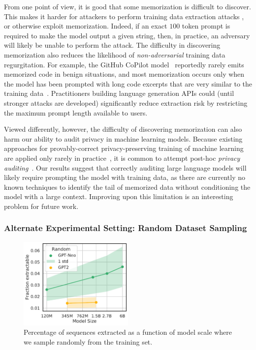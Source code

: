 From one point of view, it is good that some memorization is difficult to discover.
This makes it harder for attackers to perform training data extraction attacks \citep{carlini2020extracting},
or otherwise exploit memorization.
Indeed, if an exact $100$ token prompt is required to make the model output a given string, then, in practice, an adversary will likely be unable to perform the attack.
%
The difficulty in discovering memorization also reduces the likelihood of \emph{non-adversarial} training data regurgitation.
For example, the GitHub CoPilot model~\citep{chen2021evaluating} reportedly rarely emits memorized code in benign situations, and most memorization occurs only when the model has been prompted with long code excerpts that are very similar to the training data~\citep{ziegler2021copilot}.
Practitioners building language generation APIs could (until stronger attacks are developed) significantly reduce extraction risk by restricting the maximum prompt length available to users.

Viewed differently, however, the difficulty of discovering memorization
can also harm our ability to audit privacy in machine learning models.
%
Because existing approaches for provably-correct privacy-preserving training of machine learning are applied only rarely in practice~\citep{abadi2016deep, thakkar2020understanding, ramaswamy2020training},
it is common to attempt post-hoc \emph{privacy auditing}~\citep{jayaraman2019evaluating, jagielski2020auditing, nasr2021adversary}.
%
Our results suggest that correctly auditing large language models will likely require prompting the model with training data, as there are currently no known techniques to identify the tail of memorized data without conditioning the model with a large context.
%
Improving upon this limitation is an interesting problem for future work.


    

    
\subsubsection{Alternate Experimental Setting: Random Dataset Sampling}
\label{section:other_approaches}

\begin{figure}[h]
    \centering
    \includegraphics[width=0.5\textwidth]{figures/random-exactly_mem-vs-model_size-prompt-all-gen-50-xlabel-ylabel} 
    \caption{Percentage of sequences extracted as a function of model scale where we sample randomly from the training set. }
    \label{fig:other_approaches_randomsize}
\end{figure}

